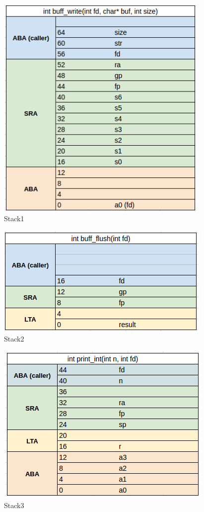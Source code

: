 \documentclass{article}
\begin{document}
\begin{figure}[H]
	\centering
		\includegraphics[scale=0.4]{stack1.png}
	\caption{Stack1}
	\label{fig:stack1}
\end{figure}

\begin{figure}[H]
	\centering
		\includegraphics[scale=0.4]{stack2.png}
	\caption{Stack2}
	\label{fig:stack2}
\end{figure}

\begin{figure}[H]
	\centering
		\includegraphics[scale=0.4]{stack3.png}
	\caption{Stack3}
	\label{fig:stack3}
\end{figure}
\end{document}
